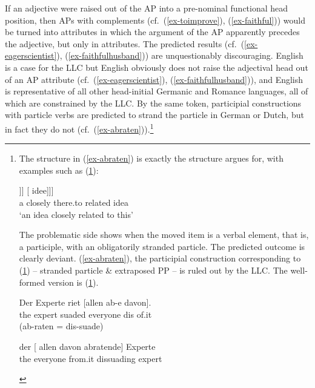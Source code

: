 \documentclass[output=paper
  ,nobabel
  ,uniformtopskip %
]{langscibook}
\begin{document}
If an adjective were raised out of the AP into a pre-nominal functional head position, then APs with complements (cf.\ (\ref{ex-toimprove}), (\ref{ex-faithful})) would be turned into attributes in which the argument of the AP apparently precedes the adjective, but only in attributes. The predicted results (cf.\ (\ref{ex-eagerscientist}), (\ref{ex-faithfulhusband})) are unquestionably discouraging. English is a case for the LLC but English obviously does not raise the adjectival head out of an AP attribute (cf.\ (\ref{ex-eagerscientist}), (\ref{ex-faithfulhusband})), and English is representative of all other head-initial Germanic and Romance languages, all of which are constrained by the LLC. By the same token, participial constructions with particle verbs are predicted to strand the particle in German or Dutch, but in fact they do not (cf.\ (\ref{ex-abraten})).\footnote{
The structure in (\ref{ex-abraten}) is exactly the structure \citet[350]{Corver1997} argues for, with examples such as (\ref{ex-daaraan}):

\ea\label{ex-daaraan}
\gll [\sub{DP} een {[\sub{NP} [\sub{AgrP} PRO [\sub{Agr$'$}} [nauw t\textsubscript{i} daaraan] [\sub{Agr} verwante\textsubscript{i}]]] [ idee]]]\\
{} a {} \spacebr{}closely {} there.to {} related {} idea\\
\glt `an idea closely related to this'
\z

\noindent
The problematic side shows when the moved item is a verbal element, that is, a participle, with an
obligatorily stranded particle. The predicted outcome is clearly deviant. (\ref{ex-abraten}), the participial construction corresponding to (\ref{ex-perte}) – stranded particle \& extraposed PP – is ruled out by the LLC. The well-formed version is (\ref{ex-dissuading}).

\begin{exe}
\ex\label{ex-perte}
\gll Der Experte riet [allen ab-e davon]. \\
     the expert suaded \spacebr{}everyone dis of.it\\ (ab-raten = dis-suade)

\ex\label{ex-dissuading}
\gll der [ allen davon abratende] Experte \\
     the {}        everyone from.it dissuading expert\\
\end{exe}\vspace{-\baselineskip}
}
\end{document}

